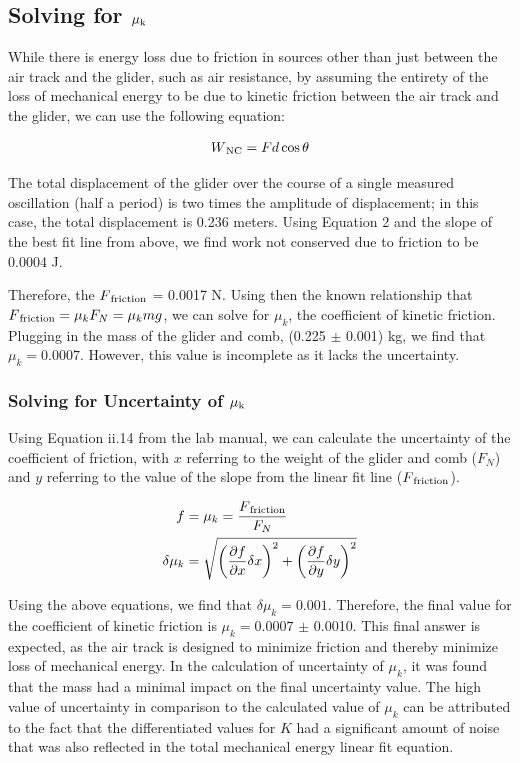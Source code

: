 \documentclass[titlepage]{article}
\begin{document}
\subsection{Solving for $\mu\textsubscript{k}$}
While there is energy loss due to friction in sources other than just between the air track and the glider, such as air resistance, by assuming the entirety of the loss of mechanical energy to be due to kinetic friction between the air track and the glider, we can use the following equation:

\begin{align}
W\textsubscript{NC} = Fd\cos\theta
\end{align}

The total displacement of the glider over the course of a single measured oscillation (half a period) is two times the amplitude of displacement; in this case, the total displacement is 0.236 meters. Using Equation 2 and the slope of the best fit line from above, we find work not conserved due to friction to be 0.0004 J.

Therefore, the $F\textsubscript{friction}$ = 0.0017 N. Using then the known relationship that $F\textsubscript{friction} = \mu_k F_N = \mu_k mg$, we can solve for $\mu_k$, the coefficient of kinetic friction. Plugging in the mass of the glider and comb, (0.225 $\pm$ 0.001) kg, we find that $\mu_k = 0.0007$. However, this value is incomplete as it lacks the uncertainty.

\subsubsection{Solving for Uncertainty of $\mu\textsubscript{k}$}
Using Equation ii.14 from the lab manual, we can calculate the uncertainty of the coefficient of friction, with $x$ referring to the weight of the glider and comb ($F_N$) and $y$ referring to the value of the slope from the linear fit line ($F\textsubscript{friction}$).

\begin{align}
f &= \mu_k = \frac{F\textsubscript{friction}}{F_N} \\
\delta \mu_k &= \sqrt{\bigg (\frac{\partial f}{\partial x} \delta x\bigg )^2 + \bigg (\frac{\partial f}{\partial y} \delta y\bigg )^2} 
\end{align}

Using the above equations, we find that $\delta \mu_k = 0.001$. Therefore, the final value for the coefficient of kinetic friction is $\mu_k = 0.0007$ $\pm$ 0.0010. This final answer is expected, as the air track is designed to minimize friction and thereby minimize loss of mechanical energy. In the calculation of uncertainty of $\mu_k$, it was found that the mass had a minimal impact on the final uncertainty value. The high value of uncertainty in comparison to the calculated value of $\mu_k$ can be attributed to the fact that the differentiated values for $K$ had a significant amount of noise that was also reflected in the total mechanical energy linear fit equation.
\end{document}

